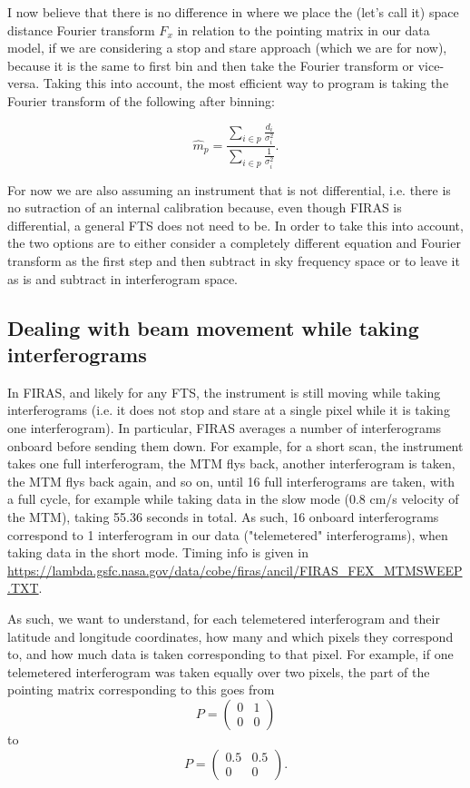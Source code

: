 \documentclass{article}
\begin{document}
I now believe that there is no difference in where we place the (let's call it) space distance Fourier transform $F_x$ in relation to the pointing matrix in our data model, if we are considering a stop and stare approach (which we are for now), because it is the same to first bin and then take the Fourier transform or vice-versa. Taking this into account, the most efficient way to program is taking the Fourier transform of the following after binning:

\begin{equation}
	\hat m_p = \frac{\sum_{i \in p}\frac{d_i}{\sigma_i^2}}{\sum_{i \in p}\frac{1}{\sigma_i^2}}.
\end{equation}

For now we are also assuming an instrument that is not differential, i.e. there is no sutraction of an internal calibration because, even though FIRAS is differential, a general FTS does not need to be. In order to take this into account, the two options are to either consider a completely different equation and Fourier transform as the first step and then subtract in sky frequency space or to leave it as is and subtract in interferogram space.

\subsection{Dealing with beam movement while taking interferograms}

In FIRAS, and likely for any FTS, the instrument is still moving while taking interferograms (i.e. it does not stop and stare at a single pixel while it is taking one interferogram). In particular, FIRAS averages a number of interferograms onboard before sending them down. For example, for a short scan, the instrument takes one full interferogram, the MTM flys back, another interferogram is taken, the MTM flys back again, and so on, until 16 full interferograms are taken, with a full cycle, for example while taking data in the slow mode (0.8 cm/s velocity of the MTM), taking 55.36 seconds in total. As such, 16 onboard interferograms correspond to 1 interferogram in our data ("telemetered" interferograms), when taking data in the short mode. Timing info is given in \url{https://lambda.gsfc.nasa.gov/data/cobe/firas/ancil/FIRAS_FEX_MTMSWEEP.TXT}.

As such, we want to understand, for each telemetered interferogram and their latitude and longitude coordinates, how many and which pixels they correspond to, and how much data is taken corresponding to that pixel. For example, if one telemetered interferogram was taken equally over two pixels, the part of the pointing matrix corresponding to this goes from
\begin{equation}
	P = \begin{pmatrix}
		0 & 1 \\
		0 & 0
	\end{pmatrix}
\end{equation}
to
\begin{equation}
	P = \begin{pmatrix}
		0.5 & 0.5 \\
		0 & 0
	\end{pmatrix}.
\end{equation}
\end{document}
